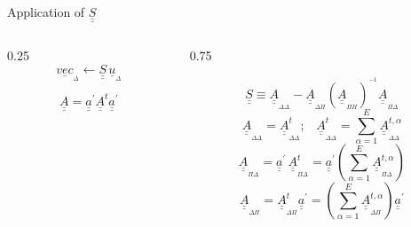 \documentclass[handout]{beamer}
\newcommand{\Matriz}[1]{\underline{\underline{#1}}}
\newcommand{\VectorD}[1]{\underline{#1}_{_\Delta}}
\newcommand{\SubScript}[1]{_{_{#1}}}
\begin{document}
\begin{frame}{Application of $\Matriz{S}$}

\begin{columns}
\begin{column}{0.25\textwidth}
\[
\VectorD{vec} \leftarrow \Matriz{S} \, \VectorD{u}
\]

\[
\Matriz{A} = \Matriz{a}^\prime \Matriz{A}^{t} \Matriz{a}^\prime
\]
\end{column}
\begin{column}{0.75\textwidth}

\[
\Matriz{S} \equiv \Matriz{A}\SubScript{\Delta \Delta} - \Matriz{A}\SubScript{\Delta \Pi} (\Matriz{A}\SubScript{\Pi \Pi})^{^{-1}} \Matriz{A}\SubScript{\Pi \Delta}
\]
\pause
\[
\Matriz{A}\SubScript{\Delta \Delta} = \Matriz{A}\SubScript{\Delta \Delta}^{t}; \,\,\,\,\,
\Matriz{A}\SubScript{\Delta \Delta}^{t} = \sum\limits_{\alpha = 1}^{E} \Matriz{A}\SubScript{\Delta \Delta}^{t, \alpha}
\]
\pause
\[
\Matriz{A}\SubScript{\Pi \Delta} = \Matriz{a}^\prime \, \Matriz{A}\SubScript{\Pi \Delta}^{t} = \Matriz{a}^\prime \left(\sum\limits_{\alpha = 1}^{E} \Matriz{A}\SubScript{\Pi \Delta}^{t, \alpha}\right)
\]
\pause
\[
\Matriz{A}\SubScript{\Delta \Pi} = \Matriz{A}\SubScript{\Delta \Pi}^{t}\Matriz{a}^\prime = \left(\sum\limits_{\alpha = 1}^{E} \Matriz{A}\SubScript{\Delta \Pi }^{t, \alpha} \right)\Matriz{a}^\prime
\]

\end{column}
\end{columns}

\end{frame}
\end{document}
